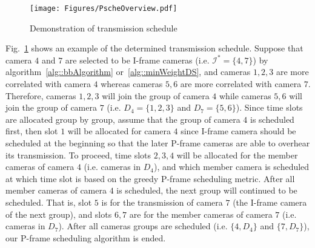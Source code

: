 \begin{figure}
\begin{center}
\texttt{[image: Figures/PscheOverview.pdf]}
\caption{\label{fig::pScheOverview}Demonstration of transmission schedule}
\end{center}
\end{figure}
%
Fig.~\ref{fig::pScheOverview} shows an example of the determined transmission schedule.
Suppose that camera $4$ and $7$ are selected to be I-frame cameras (i.e.  ${\mathcal{I}^*=\{4,7\}}$) by algorithm~\ref{alg::bbAlgorithm} or~\ref{alg::minWeightDS}, and cameras $1,2,3$ are more correlated with camera $4$ whereas cameras $5,6$ are more correlated with camera $7$.
Therefore, cameras $1,2,3$ will join the group of camera $4$ while cameras $5,6$ will join the group of camera $7$ (i.e. ${D_4=\{1,2,3\}}$ and ${D_7=\{5,6\}}$).
Since time slots are allocated group by group, assume that the group of camera $4$ is scheduled first, then slot $1$ will be allocated for camera $4$ since I-frame camera should be scheduled at the beginning so that the later P-frame cameras are able to overhear its transmission.
To proceed, time slots $2,3,4$ will be allocated for the member cameras of camera $4$ (i.e. cameras in $D_4$), and which member camera is scheduled at which time slot is based on the greedy P-frame scheduling metric.
After all member cameras of camera $4$ is scheduled, the next group will continued to be scheduled.
That is, slot $5$ is for the transmission of camera $7$ (the I-frame camera of the next group), and slots $6,7$ are for the member cameras of camera $7$ (i.e. cameras in $D_7$).
After all cameras groups are scheduled (i.e. ${\{4,D_4\}}$ and ${\{7,D_7\}}$), our P-frame scheduling algorithm is ended.
